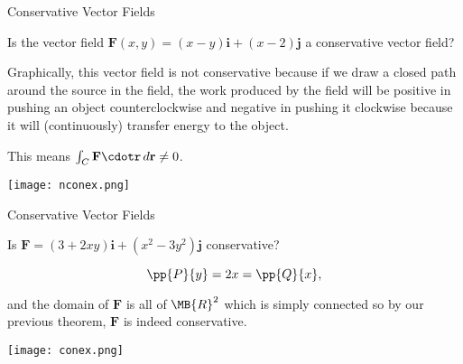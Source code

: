\documentclass[11pt,english,
handout
]{beamer}
\begin{document}
\begin{frame}[t]{Conservative Vector Fields}
\small
\begin{example}
Is the vector field $\mathbf{F}(x,y)=(x-y)\mathbf{i}+(x-2)\mathbf{j}$ a conservative vector field?

\lspace
\begin{minipage}{0.5\textwidth}
\small
Graphically, this vector field is not conservative because if we draw a closed path around the source in the field, the work produced by the field will be positive in pushing an object counterclockwise and negative in pushing it clockwise because it will (continuously) transfer energy to the object.

\lspace
This means $\int_C\mathbf{F}\cdotr\,d\mathbf{r}\neq0$.


\end{minipage}%
\begin{minipage}[c]{0.5\textwidth}
\centering
\texttt{[image: nconex.png]}
\end{minipage}
\end{example}
\end{frame}
























\begin{frame}[t]{Conservative Vector Fields}
\small

\begin{example}
Is $\mathbf{F}=(3+2xy)\mathbf{i}+(x^2-3y^2)\mathbf{j}$ conservative?\pause

\lspace
\begin{center}
\begin{minipage}{0.4\textwidth}
\[
\pp{P}{y}=2x=\pp{Q}{x},
\]

\lspace
and the domain of $\mathbf{F}$ is all of $\MB{R}^2$ which is simply connected so by our previous theorem, $\mathbf{F}$ is indeed conservative.
\end{minipage}\hspace{1cm}%
\begin{minipage}{0.5\textwidth}
\centering
\texttt{[image: conex.png]}
\end{minipage}
\end{center}
\end{example}
\end{frame}
\end{document}
